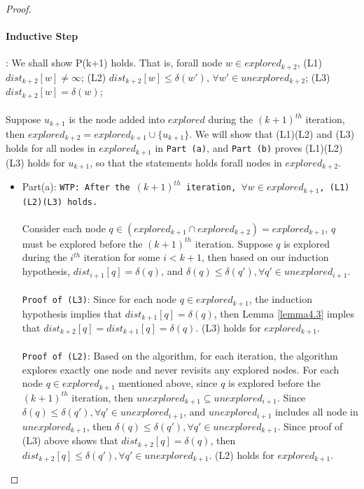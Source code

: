 \begin{proof}
\paragraph*{Inductive Step}: We shall show P(k+1) holds. That is, forall node $w \in explored_{k+2}$, (L1) $dist_{k+2}[w] \neq \infty$; (L2) $dist_{k+2}[w]\leq \delta(w')$, $\forall w' \in unexplored_{k+2}$; (L3) $dist_{k+2}[w] = \delta(w)$;
\\\\
Suppose $u_{k+1}$ is the node added into $explored$ during the $(k+1)^{th}$ iteration, then $explored_{k+2} = explored_{k+1} \cup \{u_{k+1}\}$. We will show that (L1)(L2) and (L3) holds for all nodes in $explored_{k+1}$ in \texttt{Part (a)}, and \texttt{Part (b)} proves (L1)(L2)(L3) holds for $u_{k+1}$, so that the statements holds forall nodes in $explored_{k+2}$. 
\begin{itemize}
  \item Part(a): \texttt{WTP: After the $(k+1)^{th}$ iteration, $\forall w \in explored_{k+1}$, (L1)(L2)(L3) holds.} 
  \\\\
  Consider each node $q \in (explored_{k+1} \cap explored_{k+2}) = explored_{k+1}$, $q$ must be explored before the $(k+1)^{th}$ iteration. Suppose $q$ is explored during the $i^{th}$ iteration for some $i < k+1$, then based on our induction hypothesis, $dist_{i+1}[q] = \delta(q)$, and $\delta(q) \leq \delta(q'), \forall q' \in unexplored_{i+1}$. 
  \\\\
  \texttt{Proof of (L3)}: Since for each node $q \in explored_{k+1}$, the induction hypothesis implies that $dist_{k+1}[q] = \delta(q)$, then Lemma \ref{lemma4.3} imples that $dist_{k+2}[q] = dist_{k+1}[q] = \delta(q)$. (L3) holds for $explored_{k+1}$.
  \\\\
  \texttt{Proof of (L2)}: Based on the algorithm, for each iteration, the algorithm explores exactly one node and never revisits any explored nodes. For each node $q \in explored_{k+1}$ mentioned above, since $q$ is explored before the $(k+1)^{th}$ iteration, then $unexplored_{k+1} \subseteq unexplored_{i+1}$. Since $\delta(q) \leq \delta(q'), \forall q' \in unexplored_{i+1}$, and $unexplored_{i+1}$ includes all node in $unexplored_{k+1}$, then $\delta(q) \leq \delta(q'), \forall q' \in unexplored_{k+1}$. Since proof of (L3) above shows that $dist_{k+2}[q] = \delta(q)$, then $dist_{k+2}[q] \leq \delta(q'), \forall q' \in unexplored_{k+1}$. (L2) holds for $explored_{k+1}$. 

\end{itemize}
\end{proof}
